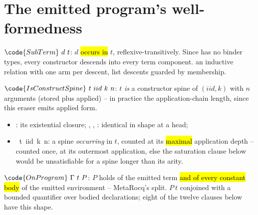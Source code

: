 \section{The emitted program's well-formedness}
\label{sec:lowering:wf}

\begin{definition}
\label{def:SubTerm}
\leanok
{}
 $\code{SubTerm}\ d\ t$: $d$ \hl{occurs in} $t$, reflexive-transitively. Since \lbox{}
has no binder types, every constructor descends into every term component.
 an inductive relation with one arm per descent, list descents guarded by membership.
\end{definition}

\begin{definition}
\label{def:ConstructSpine}
\leanok
{}
 $\code{IsConstructSpine}\ t\ iid\ k\ n$: $t$ \emph{is} a constructor spine of
$(iid,k)$ with $n$ arguments (stored plus applied) -- in practice the application-chain length, since
this eraser emits applied form.
\begin{itemize}
\item {}: its existential closure; , ,
: identical in shape at a  head;
\item {}\ t\ iid\ k\ n: a spine \emph{occurring} in $t$, counted at its
\hl{maximal} application depth -- counted once, at its outermost application, else the saturation clause
below would be unsatisfiable for a spine longer than its arity.
\end{itemize}
\end{definition}

\begin{definition}
\label{def:OnProgram}
\leanok
{}
 $\code{OnProgram}\ \Gamma\ t\ P$: $P$ holds of the emitted term \hl{and of every
constant body} of the emitted environment -- MetaRocq's  split.
 $P\ t$ conjoined with a bounded quantifier over bodied declarations; eight of the twelve
clauses below have this shape.
\end{definition}

